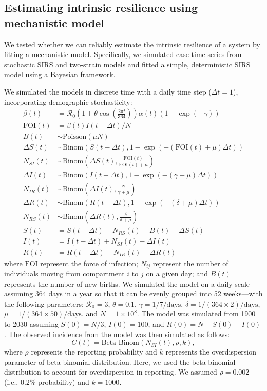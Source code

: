 \documentclass[12pt]{article}
\begin{document}
\subsection*{Estimating intrinsic resilience using mechanistic model}

We tested whether we can reliably estimate the intrinsic resilience of a system by fitting a mechanistic model.
Specifically, we simulated case time series from stochastic SIRS and two-strain models and fitted a simple, deterministic SIRS model using a Bayesian framework.

We simulated the models in discrete time with a daily time step ($\Delta t = 1$), incorporating demographic stochasticity:
\begin{align}
\beta(t) &= \mathcal R_0 \left(1 + \theta \cos\left(\frac{2 \pi t}{364}\right)\right) \alpha(t)  (1-\exp(-\gamma))\\
\textrm{FOI}(t) &= \beta(t) I(t- \Delta t)/N\\
B(t) &\sim \mathrm{Poisson}(\mu N)\\
\Delta S(t) &\sim \mathrm{Binom}\left(S(t-\Delta t), 1- \exp(-(\textrm{FOI}(t) + \mu) \Delta t )\right) \\
N_{SI}(t) &\sim \mathrm{Binom}\left(\Delta S(t), \frac{\textrm{FOI}(t)}{\textrm{FOI}(t) + \mu} \right)\\
\Delta I(t) &\sim \mathrm{Binom}\left(I(t-\Delta t), 1- \exp(-(\gamma + \mu) \Delta t )\right) \\
N_{IR}(t) &\sim \mathrm{Binom}\left(\Delta I(t), \frac{\gamma}{\gamma + \mu} \right)\\
\Delta R(t) &\sim \mathrm{Binom}\left(R(t-\Delta t), 1- \exp(-(\delta+ \mu) \Delta t )\right) \\
N_{RS}(t) &\sim \mathrm{Binom}\left(\Delta R(t), \frac{\delta}{\delta + \mu} \right)\\
S(t) &= S(t-\Delta t) + N_{RS}(t) + B(t) - \Delta S(t)\\
I(t) &= I(t-\Delta t) + N_{SI}(t) - \Delta I(t)\\
R(t) &= R(t-\Delta t) + N_{IR}(t) - \Delta R(t)
\end{align}
where $\textrm{FOI}$ represent the force of infection;
$N_{ij}$ represent the number of individuals moving from compartment $i$ to $j$ on a given day; 
and $B(t)$ represents the number of new births.
We simulated the model on a daily scale---assuming 364 days in a year so that it can be evenly grouped into 52 weeks---with the following parameters:
$\mathcal R_0 = 3$, $\theta = 0.1$, $\gamma = 1/7/\mathrm{days}$, $\delta = 1/(364\times 2)/\mathrm{days}$,
$\mu =1/(364\times 50)/\mathrm{days}$, and $N = 1 \times 10^{8}$.
The model was simulated from 1900 to 2030 assuming $S(0) = N/3$, $I(0) = 100$, and $R(0) = N - S(0) - I(0)$.
The observed incidence from the model was then simulated as follows:
\begin{equation}
C(t) = \textrm{Beta-Binom}(N_{SI}(t), \rho, k), 
\end{equation}
where $\rho$ represents the reporting probability and $k$ represents the overdispersion parameter of beta-binomial distribution.
Here, we used the beta-binomial distribution to account for overdispersion in reporting.
We assumed $\rho = 0.002$ (i.e., 0.2\% probability) and $k = 1000$.
\end{document}

